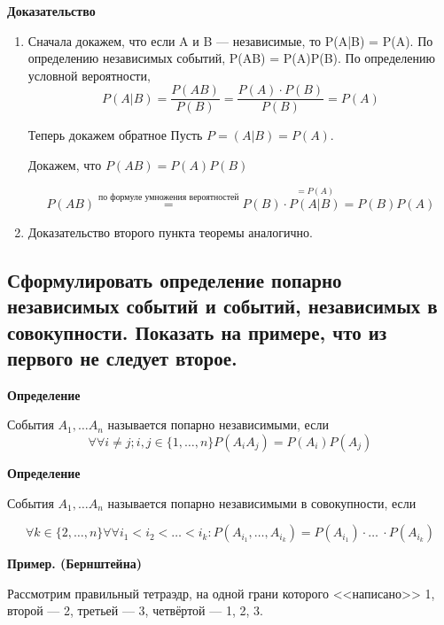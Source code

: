 \textbf{Доказательство}

\begin{enumerate}
	\item Сначала докажем, что если A и B --- независимые, то P(A|B) = P(A).
	По определению независимых событий, P(AB) = P(A)P(B). По определению условной вероятности, 
	\begin{equation}
		P(A|B) = \frac{P(AB)}{P(B)} = \frac{P(A) \cdot P(B)}{P(B)} = P(A)
	\end{equation}

	Теперь докажем обратное
	Пусть $P =(A|B) = P(A)$. 
	
	Докажем, что $P(AB) = P(A)P(B)$
	
	\begin{equation}
		P(AB) \stackrel{\text{по формуле умножения вероятностей}}{=} P(B) \cdot \stackrel{=P(A)}{P(A|B)} = P(B)P(A)
	\end{equation}

	\item Доказательство второго пункта теоремы аналогично.
\end{enumerate}

\subsection{Сформулировать определение попарно независимых событий и событий, независимых в совокупности. Показать на примере, что из первого не следует второе.}

\textbf{Определение}

События $A_1, \dots A_n$ называется попарно независимыми, если
\begin{equation}
	\forall \forall i \neq j; i,j \in \{1, \dots, n\} P(A_i A_j) = P(A_i)P(A_j)
\end{equation}


\textbf{Определение}

События $A_1, \dots A_n$ называется попарно независимыми в совокупности, если

\begin{equation}
	\forall k \in \{2, \dots, n\} \forall \forall i_1 < i_2 < \dots < i_k: P(A_{i_1}, \dots, A_{i_k}) = P(A_{i_1}) \cdot \dots\ \cdot P(A_{i_k})
\end{equation}

\textbf{Пример. (Бернштейна)}

Рассмотрим правильный тетраэдр, на одной грани которого <<написано>> 1, второй --- 2, третьей --- 3, четвёртой --- 1, 2, 3.

